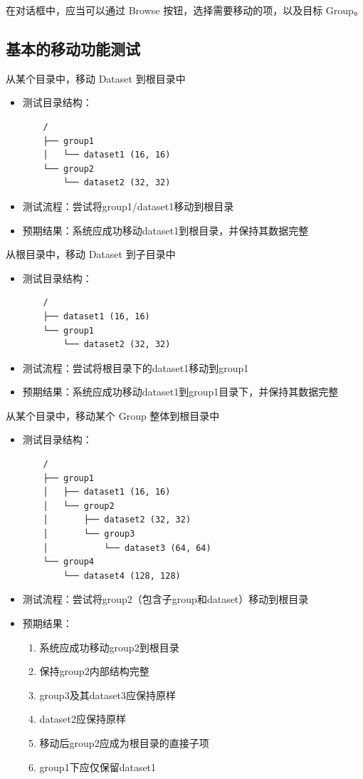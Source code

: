 \documentclass[a4paper,12pt]{report}	%
\begin{document}
在对话框中，应当可以通过 Browse 按钮，选择需要移动的项，以及目标 Group。 

\subsection{基本的移动功能测试}
从某个目录中，移动 Dataset 到根目录中 
\begin{itemize}
    \item 测试目录结构：
    \begin{verbatim}
    /
    ├── group1
    │   └── dataset1 (16, 16)
    └── group2
        └── dataset2 (32, 32)
    \end{verbatim}
    \item 测试流程：尝试将group1/dataset1移动到根目录
    \item 预期结果：系统应成功移动dataset1到根目录，并保持其数据完整
\end{itemize}

从根目录中，移动 Dataset 到子目录中
\begin{itemize}
    \item 测试目录结构：
    \begin{verbatim}
    /
    ├── dataset1 (16, 16)
    └── group1
        └── dataset2 (32, 32)
    \end{verbatim}
    \item 测试流程：尝试将根目录下的dataset1移动到group1
    \item 预期结果：系统应成功移动dataset1到group1目录下，并保持其数据完整
\end{itemize}

从某个目录中，移动某个 Group 整体到根目录中 
\begin{itemize}
    \item 测试目录结构：
    \begin{verbatim}
    /
    ├── group1
    │   ├── dataset1 (16, 16)
    │   └── group2
    │       ├── dataset2 (32, 32)
    │       └── group3
    │           └── dataset3 (64, 64)
    └── group4
        └── dataset4 (128, 128)
    \end{verbatim}
    \item 测试流程：尝试将group2（包含子group和dataset）移动到根目录
    \item 预期结果：
    \begin{enumerate}
        \item 系统应成功移动group2到根目录
        \item 保持group2内部结构完整
        \item group3及其dataset3应保持原样
        \item dataset2应保持原样
        \item 移动后group2应成为根目录的直接子项
        \item group1下应仅保留dataset1
    \end{enumerate}
\end{itemize}
\end{document}
